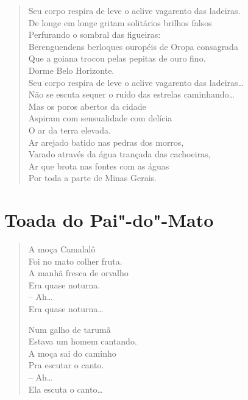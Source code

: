 {\begin{verse}
Seu corpo respira de leve o aclive vagarento das ladeiras.\\
De longe em longe gritam solitários brilhos falsos\\
Perfurando o sombral das figueiras:\\
Berenguendens berloques ouropéis de Oropa consagrada\\
Que a goiana trocou pelas pepitas de ouro fino.\\
Dorme Belo Horizonte.\\
Seu corpo respira de leve o aclive vagarento das ladeiras\ldots{}\\
Não se escuta sequer o ruído das estrelas caminhando\ldots{}\\
Mas os poros abertos da cidade\\
Aspiram com sensualidade com delícia\\
O ar da terra elevada.\\
Ar arejado batido nas pedras dos morros,\\
Varado através da água trançada das cachoeiras,\\
Ar que brota nas fontes com as águas\\
Por toda a parte de Minas Gerais.
\end{verse}


\chapter[Toada do Pai"-do"-Mato]{Toada do Pai"-do"-Mato }




\begin{verse}
A moça Camalalô\\
Foi no mato colher fruta.\\
A manhã fresca de orvalho\\
Era quase noturna.\\
\qquad-- Ah\ldots{}\\
Era quase noturna\ldots{}

Num galho de tarumã\\
Estava um homem cantando.\\
A moça sai do caminho\\
Pra escutar o canto.\\
\qquad-- Ah\ldots{}\\
Ela escuta o canto\ldots{}


\end{verse}}
